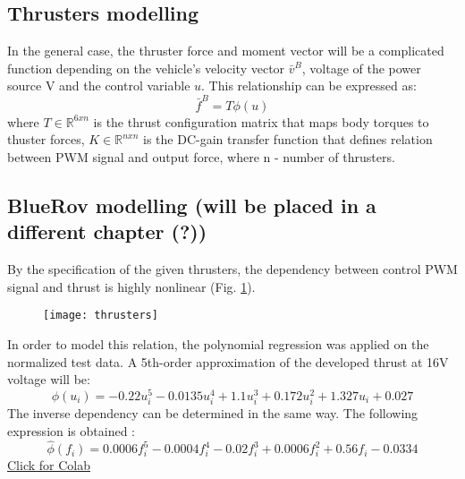     \subsection{Thrusters modelling}

    In the general case, the thruster force and moment vector will be 
    a complicated function depending on the vehicle's velocity vector $\bar{v}^B$, 
    voltage of the power source V 
    and the control variable $u$.
    This relationship can be expressed as:
    $$
    \bar{f}^B=T\phi(u)
    $$
    where $T \in \mathbb{R}^{6 x n}$ is the thrust configuration matrix that maps body torques to thuster forces, 
    $K \in \mathbb{R}^{n x n}$ is the DC-gain transfer function that defines relation between
    PWM signal and output force, where n - number of thrusters.

    \subsection{BlueRov modelling (will be placed in a different chapter (?))}

    By the specification of the given thrusters, the dependency between control 
    PWM signal and thrust is highly nonlinear
    (Fig. \ref{image:thrust}).\\
    \begin{figure}[H]
        \centering\texttt{[image: thrusters]}
        \caption{}
        \label{image:thrust}
    \end{figure}
    In order to model this relation, the polynomial regression was applied on the normalized test data. 
    A 5th-order approximation of the developed thrust at 16V voltage will be:
    $$
    \phi(u_i) = - 0.22 u_i^5
    - 0.0135 u_i^4
    + 1.1 u_i^3
    + 0.172 u_i^2
    + 1.327 u_i 
    + 0.027
    $$
    The inverse dependency can be determined in the same way. 
    The following expression is obtained :
    $$
    \hat{\phi}(f_i) = 0.0006 f_i^5 
    - 0.0004 f_i^4 
    - 0.02 f_i^3
    + 0.0006 f_i^2 
    + 0.56 f_i
    -0.0334
    $$
    \href{https://colab.research.google.com/drive/1XaNNENZPk88yaddOYy01vXtHd8_YwT2m?usp=sharing}{Click for Colab}